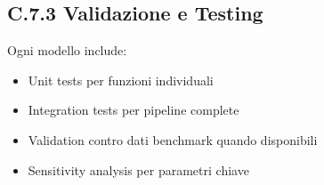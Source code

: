 \subsection{C.7.3 Validazione e Testing}

Ogni modello include:
\begin{itemize}
    \item Unit tests per funzioni individuali
    \item Integration tests per pipeline complete
    \item Validation contro dati benchmark quando disponibili
    \item Sensitivity analysis per parametri chiave
\end{itemize}